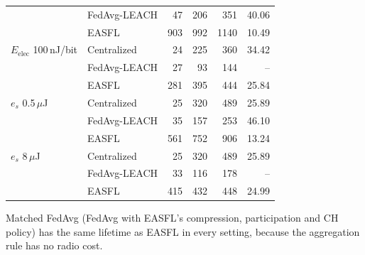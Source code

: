 \documentclass[journal,onecolumn]{IEEEtran}
\begin{document}
\begin{table}[h]
\begin{tabular}{@{}llrrrr@{}}
 & FedAvg-LEACH & 47 & 206 & 351 & 40.06\\
 & EASFL & 903 & 992 & 1140 & 10.49\\
\midrule
$E_{\mathrm{elec}}$ 100\,nJ/bit & Centralized & 24 & 225 & 360 & 34.42\\
 & FedAvg-LEACH & 27 & 93 & 144 & --\\
 & EASFL & 281 & 395 & 444 & 25.84\\
\midrule
$e_s$ 0.5\,$\mu$J & Centralized & 25 & 320 & 489 & 25.89\\
 & FedAvg-LEACH & 35 & 157 & 253 & 46.10\\
 & EASFL & 561 & 752 & 906 & 13.24\\
\midrule
$e_s$ 8\,$\mu$J & Centralized & 25 & 320 & 489 & 25.89\\
 & FedAvg-LEACH & 33 & 116 & 178 & --\\
 & EASFL & 415 & 432 & 448 & 24.99\\

\bottomrule\end{tabular}\end{table}
Matched FedAvg (FedAvg with EASFL's compression, participation and CH policy) has the same lifetime as EASFL in every setting, because the aggregation rule has no radio cost.
\end{document}
